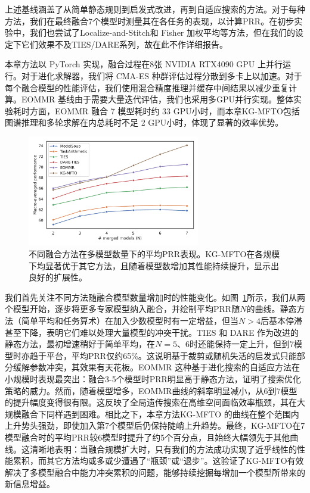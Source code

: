 \documentclass[../main.tex]{subfiles}
\begin{document}
上述基线涵盖了从简单静态规则到启发式改进，再到自适应搜索的方法。对于每种方法，我们在最终融合7个模型时测量其在各任务的表现，以计算PRR。在初步实验中，我们也尝试了Localize-and-Stitch和 Fisher 加权平均等方法，但在我们的设定下它们效果不及TIES/DARE系列，故在此不作详细报告。


本章方法以 PyTorch 实现，融合过程在8张 NVIDIA RTX4090 GPU 上并行运行。对于进化求解器，我们将 CMA-ES 种群评估过程分散到多卡上以加速。对于每个融合模型的性能评估，我们使用混合精度推理并缓存中间结果以减少重复计算。EOMMR 基线由于需要大量迭代评估，我们也采用多GPU并行实现。整体实验耗时方面，EOMMR 融合 7 模型耗时约 33 GPU小时，而本章KG-MFTO包括图谱推理和多轮求解在内总耗时不足 2 GPU小时，体现了显著的效率优势。


\begin{figure}
	\centering
	\includegraphics[width=0.67\textwidth]{KG-MFTO/figure1_perf_scaling.pdf}
	\caption{不同融合方法在多模型数量下的平均PRR表现。KG-MFTO在各规模下均显著优于其它方法，且随着模型数增加其性能持续提升，显示出良好的扩展性。}
	\label{fig:merge-performance-vs-num-models}
\end{figure}

我们首先关注不同方法随融合模型数量增加时的性能变化。如图~\ref{fig:merge-performance-vs-num-models}所示，我们从两个模型开始，逐步将更多专家模型纳入融合，并绘制平均PRR随$N$的曲线。静态方法（简单平均和任务算术）在加入少数模型时有一定增益，但当$N>4$后基本停滞甚至下降，表明它们难以处理大量模型的冲突干扰。TIES 和 DARE 作为改进的静态方法，最初增速稍好于简单平均，在$N=5$、6时还能保持一定上升，但到7模型时亦趋于平台，平均PRR仅约65\%。这说明基于裁剪或随机失活的启发式只能部分缓解参数冲突，其效果有天花板。EOMMR 这种基于进化搜索的自适应方法在小规模时表现最突出：融合3-5个模型时PRR明显高于静态方法，证明了搜索优化策略的威力。然而，随着模型增多，EOMMR曲线的斜率明显减小，从6到7模型的提升幅度变得很有限。这反映了全局遗传搜索在高维空间面临效率瓶颈，其在大规模融合下同样遇到困难。相比之下，本章方法KG-MFTO 的曲线在整个范围内上升势头强劲，即使加入第7个模型后仍保持陡峭上升趋势。最终，KG-MFTO在7模型融合时的平均PRR较6模型时提升了约5个百分点，且始终大幅领先于其他曲线。这清晰地表明：当融合规模扩大时，只有我们的方法成功实现了近乎线性的性能累积，而其它方法均或多或少遭遇了“瓶颈”或“退步”。这验证了KG-MFTO有效解决了多模型融合中能力冲突累积的问题，能够持续挖掘每增加一个模型所带来的新信息增益。
\end{document}

